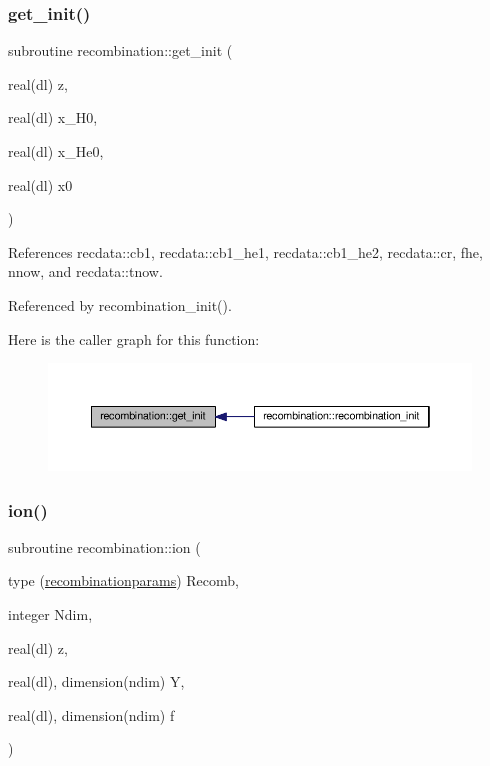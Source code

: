 \subsubsection{\texorpdfstring{get\+\_\+init()}{get\_init()}}
{\footnotesize\ttfamily subroutine recombination\+::get\+\_\+init (\begin{DoxyParamCaption}\item[{real(dl)}]{z,  }\item[{real(dl)}]{x\+\_\+\+H0,  }\item[{real(dl)}]{x\+\_\+\+He0,  }\item[{real(dl)}]{x0 }\end{DoxyParamCaption})}



References recdata\+::cb1, recdata\+::cb1\+\_\+he1, recdata\+::cb1\+\_\+he2, recdata\+::cr, fhe, nnow, and recdata\+::tnow.



Referenced by recombination\+\_\+init().

Here is the caller graph for this function\+:
\nopagebreak
\begin{figure}[H]
\begin{center}
\leavevmode
\includegraphics[width=350pt]{namespacerecombination_a7c190d70dfd56d14181b4ae8535dcd4d_icgraph}
\end{center}
\end{figure}
\mbox{\label{namespacerecombination_a5f644f40f1384d3dd16e675369854f63}} 
\subsubsection{\texorpdfstring{ion()}{ion()}}
{\footnotesize\ttfamily subroutine recombination\+::ion (\begin{DoxyParamCaption}\item[{type (\mbox{\hyperlink{structrecombination_1_1recombinationparams}{recombinationparams}})}]{Recomb,  }\item[{integer}]{Ndim,  }\item[{real(dl)}]{z,  }\item[{real(dl), dimension(ndim)}]{Y,  }\item[{real(dl), dimension(ndim)}]{f }\end{DoxyParamCaption})}



